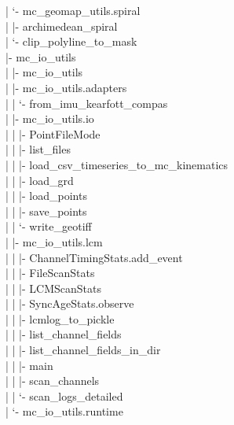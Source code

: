 \documentclass[11pt]{article}
\begin{document}
\textcolor{TreeLevelTwo}{|  `- mc\_geomap\_utils.spiral}\\
\textcolor{TreeLevelThree}{|     |- archimedean\_spiral}\\
\textcolor{TreeLevelThree}{|     `- clip\_polyline\_to\_mask}\\
\textcolor{TreeLevelOne}{|- mc\_io\_utils}\\
\textcolor{TreeLevelTwo}{|  |- mc\_io\_utils}\\
\textcolor{TreeLevelTwo}{|  |- mc\_io\_utils.adapters}\\
\textcolor{TreeLevelThree}{|  |  `- from\_imu\_kearfott\_compas}\\
\textcolor{TreeLevelTwo}{|  |- mc\_io\_utils.io}\\
\textcolor{TreeLevelThree}{|  |  |- PointFileMode}\\
\textcolor{TreeLevelThree}{|  |  |- list\_files}\\
\textcolor{TreeLevelThree}{|  |  |- load\_csv\_timeseries\_to\_mc\_kinematics}\\
\textcolor{TreeLevelThree}{|  |  |- load\_grd}\\
\textcolor{TreeLevelThree}{|  |  |- load\_points}\\
\textcolor{TreeLevelThree}{|  |  |- save\_points}\\
\textcolor{TreeLevelThree}{|  |  `- write\_geotiff}\\
\textcolor{TreeLevelTwo}{|  |- mc\_io\_utils.lcm}\\
\textcolor{TreeLevelThree}{|  |  |- ChannelTimingStats.add\_event}\\
\textcolor{TreeLevelThree}{|  |  |- FileScanStats}\\
\textcolor{TreeLevelThree}{|  |  |- LCMScanStats}\\
\textcolor{TreeLevelThree}{|  |  |- SyncAgeStats.observe}\\
\textcolor{TreeLevelThree}{|  |  |- lcmlog\_to\_pickle}\\
\textcolor{TreeLevelThree}{|  |  |- list\_channel\_fields}\\
\textcolor{TreeLevelThree}{|  |  |- list\_channel\_fields\_in\_dir}\\
\textcolor{TreeLevelThree}{|  |  |- main}\\
\textcolor{TreeLevelThree}{|  |  |- scan\_channels}\\
\textcolor{TreeLevelThree}{|  |  `- scan\_logs\_detailed}\\
\textcolor{TreeLevelTwo}{|  `- mc\_io\_utils.runtime}\\
\end{document}
